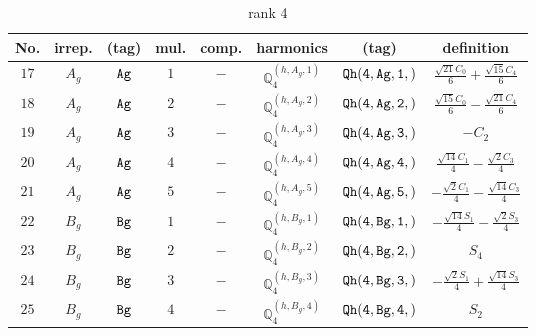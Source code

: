 \documentclass[fleqn,8pt]{jsarticle}
\begin{document}
\begin{table}[ht!]
\begin{center}
\caption{rank 4}
\renewcommand{\arraystretch}{1.3}
\begin{tabular}{cccccccc} \hline \hline
No. & irrep. & (tag) & mul. & comp. & harmonics & (tag) & definition \\ \hline
$ 17 $ & $ A_{g} $ & $ {\tt Ag} $ & $ 1 $ & $ - $ & $ \mathbb{Q}_{4}^{(h,A_{g},1)} $ & $ {\tt Qh(4,Ag,1,)} $ & $ \frac{\sqrt{21} C_{0}}{6} + \frac{\sqrt{15} C_{4}}{6} $ \\
$ 18 $ & $ A_{g} $ & $ {\tt Ag} $ & $ 2 $ & $ - $ & $ \mathbb{Q}_{4}^{(h,A_{g},2)} $ & $ {\tt Qh(4,Ag,2,)} $ & $ \frac{\sqrt{15} C_{0}}{6} - \frac{\sqrt{21} C_{4}}{6} $ \\
$ 19 $ & $ A_{g} $ & $ {\tt Ag} $ & $ 3 $ & $ - $ & $ \mathbb{Q}_{4}^{(h,A_{g},3)} $ & $ {\tt Qh(4,Ag,3,)} $ & $ - C_{2} $ \\
$ 20 $ & $ A_{g} $ & $ {\tt Ag} $ & $ 4 $ & $ - $ & $ \mathbb{Q}_{4}^{(h,A_{g},4)} $ & $ {\tt Qh(4,Ag,4,)} $ & $ \frac{\sqrt{14} C_{1}}{4} - \frac{\sqrt{2} C_{3}}{4} $ \\
$ 21 $ & $ A_{g} $ & $ {\tt Ag} $ & $ 5 $ & $ - $ & $ \mathbb{Q}_{4}^{(h,A_{g},5)} $ & $ {\tt Qh(4,Ag,5,)} $ & $ - \frac{\sqrt{2} C_{1}}{4} - \frac{\sqrt{14} C_{3}}{4} $ \\
$ 22 $ & $ B_{g} $ & $ {\tt Bg} $ & $ 1 $ & $ - $ & $ \mathbb{Q}_{4}^{(h,B_{g},1)} $ & $ {\tt Qh(4,Bg,1,)} $ & $ - \frac{\sqrt{14} S_{1}}{4} - \frac{\sqrt{2} S_{3}}{4} $ \\
$ 23 $ & $ B_{g} $ & $ {\tt Bg} $ & $ 2 $ & $ - $ & $ \mathbb{Q}_{4}^{(h,B_{g},2)} $ & $ {\tt Qh(4,Bg,2,)} $ & $ S_{4} $ \\
$ 24 $ & $ B_{g} $ & $ {\tt Bg} $ & $ 3 $ & $ - $ & $ \mathbb{Q}_{4}^{(h,B_{g},3)} $ & $ {\tt Qh(4,Bg,3,)} $ & $ - \frac{\sqrt{2} S_{1}}{4} + \frac{\sqrt{14} S_{3}}{4} $ \\
$ 25 $ & $ B_{g} $ & $ {\tt Bg} $ & $ 4 $ & $ - $ & $ \mathbb{Q}_{4}^{(h,B_{g},4)} $ & $ {\tt Qh(4,Bg,4,)} $ & $ S_{2} $ \\
 \hline \hline
\end{tabular}
\end{center}
\end{table}
\end{document}

